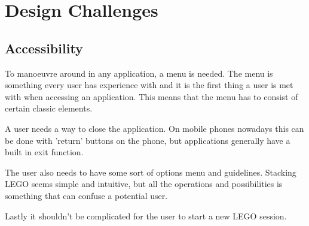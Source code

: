 
\section{Design Challenges}
\subsection{Accessibility}
To manoeuvre around in any application, a menu is needed. The menu is something every user has experience with and it is the first thing a user is met with when accessing an application. This means that the menu has to consist of certain classic elements.\par A user needs a way to close the application. On mobile phones nowadays this can be done with 'return' buttons on the phone, but applications generally have a built in exit function.\par
The user also needs to have some sort of options menu and guidelines. Stacking LEGO seems simple and intuitive, but all the operations and possibilities is something that can confuse a potential user. \par
Lastly it shouldn't be complicated for the user to start a new LEGO session. \par

